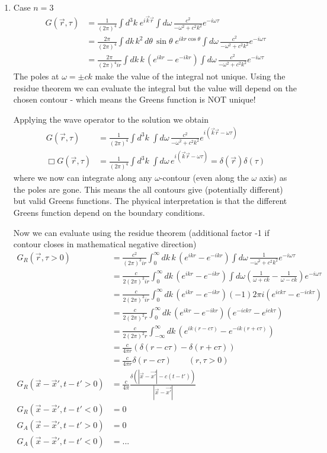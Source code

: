 \documentclass[10pt,a4paper]{book}
\theoremstyle{definition}
\begin{document}
\begin{itemize}
\begin{enumerate}
\item Case $n=3$
\begin{align}
G(\vec{r},\tau)
&=\frac{1}{(2\pi)^4}\int d^3k\;e^{i\vec{k}\vec{r}} \int d\omega\,\frac{c^2}{-\omega^2+c^2k^2}e^{-i\omega\tau}\\
&=\frac{2\pi}{(2\pi)^4}\int dk\,k^2\,d\theta\,\sin\theta\;e^{ikr\cos\theta} \int d\omega\,\frac{c^2}{-\omega^2+c^2k^2}e^{-i\omega\tau}\\
&=\frac{2\pi}{(2\pi)^4ir}\int dk\,k\,(e^{ikr}-e^{-ikr}) \int d\omega\,\frac{c^2}{-\omega^2+c^2k^2}e^{-i\omega\tau}
\end{align}
The poles at $\omega=\pm ck$ make the value of the integral not  
unique. Using the residue theorem we can evaluate the integral but the value will depend on the chosen contour - which means the Greens function is NOT unique!

Applying the wave operator to the solution we obtain 
\begin{align}
G(\vec{r},\tau)&=\frac{1}{(2\pi)^4}\int d^3k\;\int d\omega\,\frac{c^2}{-\omega^2+c^2k^2}e^{i(\vec{k}\vec{r}-\omega\tau)}\\
\Box G(\vec{r},\tau)&=\frac{1}{(2\pi)^4}\int d^3k\;\int d\omega\,e^{i(\vec{k}\vec{r}-\omega\tau)}=\delta(\vec{r})\delta(\tau)
\end{align}
where we now can integrate along any $\omega$-contour (even along the $\omega$ axis) as the poles are gone. This means the all contours give (potentially different) but valid Greens functions. The physical interpretation is that the different Greens function depend on the boundary conditions.

Now we can evaluate using the residue theorem (additional factor -1 if contour closes in mathematical negative direction)
\begin{align}
G_R(\vec{r},\tau>0)
&=\frac{c^2}{(2\pi)^3ir}\int_0^\infty dk\,k\,(e^{ikr}-e^{-ikr}) \int d\omega\,\frac{1}{-\omega^2+c^2k^2}e^{-i\omega\tau}\\
&=\frac{c}{2(2\pi)^3ir}\int_0^\infty dk\,(e^{ikr}-e^{-ikr}) \int d\omega\left(\frac{1}{\omega+ck}-\frac{1}{\omega-ck}\right)e^{-i\omega\tau}\\
&=\frac{c}{2(2\pi)^3ir}\int_0^\infty dk\,(e^{ikr}-e^{-ikr})(-1)2\pi i\left(e^{ick\tau}-e^{-ick\tau}\right)\\
&=\frac{c}{2(2\pi)^2r}\int_0^\infty dk\,(e^{ikr}-e^{-ikr})\left(e^{-ick\tau}-e^{ick\tau}\right)\\
&=\frac{c}{2(2\pi)^2r}\int_{-\infty}^\infty dk\,(e^{ik(r-c\tau)}-e^{-ik(r+c\tau)})\\
&=\frac{c}{4\pi r}\left(\delta(r-c\tau)-\delta(r+c\tau)\right)\\
&=\frac{c}{4\pi r}\delta(r-c\tau)\qquad(r,\tau>0)\\
G_R(\vec{x}-\vec{x}',t-t'>0)
&=\frac{c}{4\pi}\frac{\delta(|\vec{x}-\vec{x'}|-c(t-t'))}{|\vec{x}-\vec{x'}|}\\
G_R(\vec{x}-\vec{x}',t-t'<0)&=0\\
G_A(\vec{x}-\vec{x}',t-t'>0)&=0\\
G_A(\vec{x}-\vec{x}',t-t'<0)&=...
\end{align}
\end{enumerate}


\end{itemize}
\end{document}
